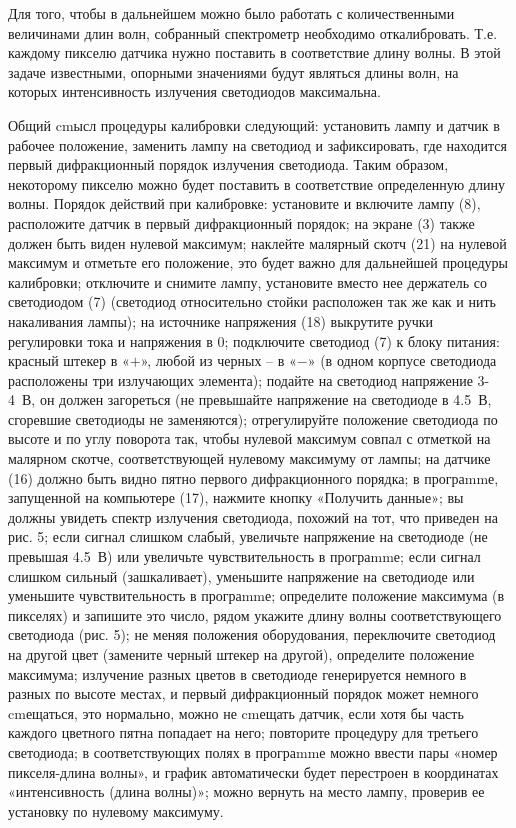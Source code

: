 \documentclass[11pt,a4paper]{article}
\begin{document}
Для того, чтобы в дальнейшем можно было работать с количественными величинами длин волн, собранный спектрометр необходимо откалибровать. Т.е. каждому пикселю датчика нужно поставить в соответствие длину волны. В этой задаче известными, опорными значениями будут являться длины волн, на которых интенсивность излучения светодиодов максимальна.

Общий cmысл процедуры калибровки следующий: установить лампу и датчик в рабочее положение, заменить лампу на светодиод и зафиксировать, где находится первый дифракционный порядок излучения светодиода. Таким образом, некоторому пикселю можно будет поставить в соответствие определенную длину волны. Порядок действий при калибровке: установите и включите лампу (8), расположите датчик в первый дифракционный порядок; на экране (3) также должен быть виден нулевой максимум; наклейте малярный скотч (21) на нулевой максимум и отметьте его положение, это будет важно для дальнейшей процедуры калибровки; отключите и снимите лампу, установите вместо нее держатель со светодиодом (7) (светодиод относительно стойки расположен так же как и нить накаливания лампы); на источнике напряжения (18) выкрутите ручки регулировки тока и напряжения в 0; подключите светодиод (7) к блоку питания: красный штекер в «$+$», любой из черных – в «$-$» (в одном корпусе светодиода расположены три излучающих элемента); подайте на светодиод напряжение 3-4 В, он должен загореться (не превышайте напряжение на светодиоде в 4.5 В, сгоревшие светодиоды не заменяются); отрегулируйте положение светодиода по высоте и по углу поворота так, чтобы нулевой максимум совпал с отметкой на малярном скотче, соответствующей нулевому максимуму от лампы; на датчике (16) должно быть видно пятно первого дифракционного порядка; в програmmе, запущенной на компьютере (17), нажмите кнопку «Получить данные»; вы должны увидеть спектр излучения светодиода, похожий на тот, что приведен на рис. 5; если сигнал слишком слабый, увеличьте напряжение на светодиоде (не превышая 4.5 В) или увеличьте чувствительность в програmmе; если сигнал слишком сильный (зашкаливает), уменьшите напряжение на светодиоде или уменьшите чувствительность в програmmе; определите положение максимума (в пикселях) и запишите это число, рядом укажите длину волны соответствующего светодиода (рис. 5); не меняя положения оборудования, переключите светодиод на другой цвет (замените черный штекер на другой), определите положение максимума; излучение разных цветов в светодиоде генерируется немного в разных по высоте местах, и первый дифракционный порядок может немного cmещаться, это нормально, можно не cmещать датчик, если хотя бы часть каждого цветного пятна попадает на него; повторите процедуру для третьего светодиода; в соответствующих полях в програmmе можно ввести пары «номер пикселя-длина волны», и график автоматически будет перестроен в координатах «интенсивность (длина волны)»; можно вернуть на место лампу, проверив ее установку по нулевому максимуму.
\end{document}
